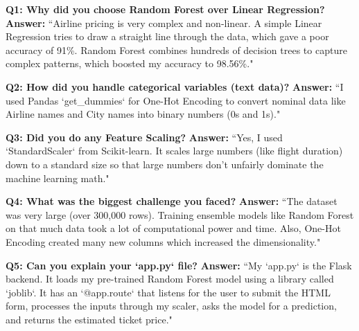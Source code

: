 \documentclass[12pt]{article}
\begin{document}
\textbf{Q1: Why did you choose Random Forest over Linear Regression?}
\newline \textbf{Answer:} ``Airline pricing is very complex and non-linear. A simple Linear Regression tries to draw a straight line through the data, which gave a poor accuracy of 91\%. Random Forest combines hundreds of decision trees to capture complex patterns, which boosted my accuracy to 98.56\%."

\textbf{Q2: How did you handle categorical variables (text data)?}
\newline \textbf{Answer:} ``I used Pandas `get\_dummies` for One-Hot Encoding to convert nominal data like Airline names and City names into binary numbers (0s and 1s)."

\textbf{Q3: Did you do any Feature Scaling?}
\newline \textbf{Answer:} ``Yes, I used `StandardScaler` from Scikit-learn. It scales large numbers (like flight duration) down to a standard size so that large numbers don't unfairly dominate the machine learning math."

\textbf{Q4: What was the biggest challenge you faced?}
\newline \textbf{Answer:} ``The dataset was very large (over 300,000 rows). Training ensemble models like Random Forest on that much data took a lot of computational power and time. Also, One-Hot Encoding created many new columns which increased the dimensionality."

\textbf{Q5: Can you explain your `app.py` file?}
\newline \textbf{Answer:} ``My `app.py` is the Flask backend. It loads my pre-trained Random Forest model using a library called `joblib`. It has an `@app.route` that listens for the user to submit the HTML form, processes the inputs through my scaler, asks the model for a prediction, and returns the estimated ticket price."
\end{document}
